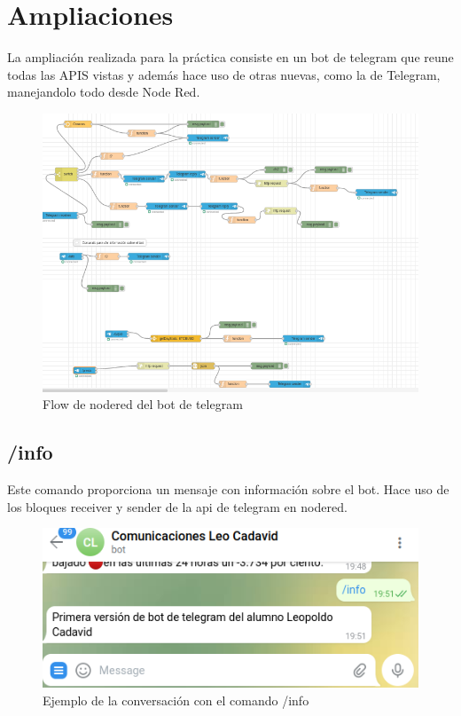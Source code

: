 \documentclass[12pt]{article}
\begin{document}
\section{Ampliaciones}

La ampliación realizada para la práctica consiste en un bot de telegram que reune todas las APIS vistas y además hace uso de otras nuevas, como la de Telegram, 
manejandolo todo desde Node Red. \\

\begin{figure}[H]
    \centering
    \includegraphics[scale=0.4]{BOTNODERED.png}
    \caption{Flow de nodered del bot de telegram}
    \label{elbot}
\end{figure}

\subsection{/info}

Este comando proporciona un mensaje con información sobre el bot. Hace uso de
los bloques receiver y sender de la api de telegram
en nodered.\\

\begin{figure}[H]
    \centering
    \includegraphics[scale=0.4]{comandoinfo.png}
    \caption{Ejemplo de la conversación con el comando /info}
    \label{info}
\end{figure}
\end{document}
